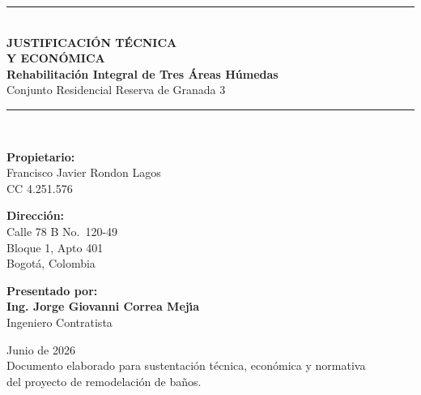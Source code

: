 ﻿\documentclass[12pt]{article}
\begin{document}
\begin{titlepage}
  \centering
  \vspace*{1.5cm}
  {\color{primary}\rule{\textwidth}{2.5pt}}\\[1cm]
  {\Huge\bfseries\color{primary}\lsstyle JUSTIFICACIÓN TÉCNICA}\\[0.2cm]
  {\Huge\bfseries\color{primary}\lsstyle Y ECONÓMICA}\\[1.2cm]
  {\LARGE\bfseries\color{secondary} Rehabilitación Integral de Tres Áreas Húmedas}\\[0.3cm]
  {\large\color{primary!70!black} Conjunto Residencial Reserva de Granada 3}\\[1.2cm]
  {\color{primary}\rule{\textwidth}{2.5pt}}\\[1.5cm]

  \begin{minipage}[t]{0.43\textwidth}
    \centering
    {\normalsize\bfseries\color{primary!80!black} Propietario:}\\[0.25cm]
    {\large Francisco Javier Rondon Lagos}\\[0.05cm]
    {\small CC 4.251.576}
  \end{minipage}
  \hfill
  \begin{minipage}[t]{0.43\textwidth}
    \centering
    {\normalsize\bfseries\color{primary!80!black} Dirección:}\\[0.25cm]
    {\large Calle 78 B No.~120-49}\\[0.05cm]
    {\large Bloque 1, Apto 401}\\[0.05cm]
    {\large Bogotá, Colombia}
  \end{minipage}

  \vfill
  \begin{center}
    {\normalsize\bfseries\color{primary!80!black} Presentado por:}\\[0.3cm]
    {\large\bfseries Ing. Jorge Giovanni Correa Mej\'{\i}a}\\[0.05cm]
    {\small\color{black} Ingeniero Contratista}
  \end{center}

  \vfill
  {\Large\color{primary!70!black} Junio de 2026}\\[0.5cm]
  \vfill
  {\footnotesize\color{gray!50!black} Documento elaborado para sustentación técnica, económica y normativa\\del proyecto de remodelación de baños.}
\end{titlepage}

\newpage
\tableofcontents
\newpage
\end{document}
